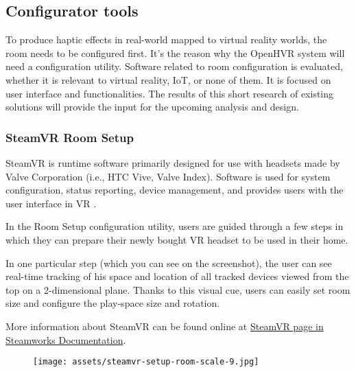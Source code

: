 \hypertarget{x-configurator-tools}{\subsection*{Configurator tools}}
To produce haptic effects in real-world mapped to virtual reality worlds,
the room needs to be configured first.
It’s the reason why the OpenHVR system will need a configuration utility.
Software related to room configuration is evaluated, whether it is relevant
to virtual reality, IoT, or none of them. It is focused on user interface and functionalities.
The results of this short research of existing solutions
will provide the input for the upcoming analysis and design.


\hypertarget{x-steamvr-room-setup}{\subsubsection*{SteamVR Room Setup}}
SteamVR is runtime software primarily designed for use with headsets made
by Valve Corporation (i.e., HTC Vive, Valve Index). Software is used for
system configuration, status reporting, device management, and provides users
with the user interface in VR \hyperlink{steamvr}{}.


In the Room Setup configuration utility, users are guided through a few steps
in which they can prepare their newly bought VR headset to be used in their
home.


In one particular step (which you can see on the screenshot), the user can see
real-time tracking of his space and location of all tracked devices viewed
from the top on a 2-dimensional plane. Thanks to this visual cue, users can
easily set room size and configure the play-space size and rotation.


More information about SteamVR can be found online at
\href{https://partner.steamgames.com/doc/features/steamvr/info}{SteamVR page in Steamworks Documentation}.


\begin{figure}[h]{}
\centering\texttt{[image: assets/steamvr-setup-room-scale-9.jpg]}
\caption{}

\end{figure}

